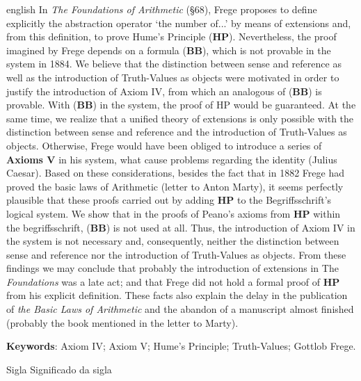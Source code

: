 \documentclass[12pt]{abntex2}
\begin{document}
\begin{resumo}[Abstract]
\begin{otherlanguage*}{english}
In \textit{The Foundations of Arithmetic} (§68), Frege proposes to define explicitly the abstraction operator `the number of...' by means of extensions and, from this definition, to prove Hume's Principle (\textbf{HP}). Nevertheless, the proof imagined by Frege depends on a formula (\textbf{BB}), which is not provable in the system in 1884. We believe that the distinction between sense and reference as well as the introduction of Truth-Values as objects were motivated in order to justify the introduction of Axiom IV, from which an analogous of (\textbf{BB}) is provable. With (\textbf{BB}) in the system, the proof of HP would be guaranteed. At the same time, we realize that a unified theory of extensions is only possible with the distinction between sense and reference and the introduction of Truth-Values as objects. Otherwise, Frege would have been obliged to introduce a series of \textbf{Axioms V} in his system, what cause problems regarding the identity (Julius Caesar). Based on these considerations, besides the fact that in 1882 Frege had proved the basic laws of Arithmetic (letter to Anton Marty), it seems perfectly plausible that these proofs carried out by adding \textbf{HP} to the Begriffsschrift's logical system. We show that in the proofs of Peano's axioms from \textbf{HP} within the begriffsschrift, (\textbf{BB}) is not used at all. Thus, the introduction of Axiom IV in the system is not necessary and, consequently, neither the distinction between sense and reference nor the introduction of Truth-Values as objects. From these findings we may conclude that probably the introduction of extensions in The \textit{Foundations} was a late act; and that Frege did not hold a formal proof of \textbf{HP} from his explicit definition. These facts also explain the delay in the publication of \textit{the Basic Laws of Arithmetic} and the abandon of a manuscript almost finished (probably the book mentioned in the letter to Marty).
\vspace{\onelineskip}
\par
\noindent \textbf{Keywords}: Axiom IV; Axiom V; Hume's Principle; Truth-Values; Gottlob Frege. 
\end{otherlanguage*} 
\end{resumo}

\begin{siglas}
\item[Sigla] Significado da sigla
\end{siglas}
\end{document}
